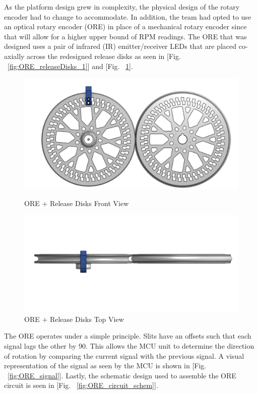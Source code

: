 As the platform design grew in complexity, the physical design of the rotary encoder had to change to accommodate. In addition, the team had opted to use an optical rotary encoder (ORE) in place of a mechanical rotary encoder since that will allow for a higher upper bound of RPM readings. The ORE that was designed uses a pair of infrared (IR) emitter/receiver LEDs that are placed co-axially across the redesigned release disks as seen in [Fig. ~\ref{fig:ORE_releaseDisks_1}] and [Fig. ~\ref{fig:ORE_releaseDisks_2}].

\begin{figure}[H]
\centering
\begin{minipage}{.5\textwidth}
  \centering
  \includegraphics[width=0.9\linewidth]{Controls/ORE_releaseDisks_1.PNG}
  \caption{\label{fig:ORE_releaseDisks_1}ORE + Release Disks Front View} 
\end{minipage}%
\begin{minipage}{.5\textwidth}
  \centering
  \includegraphics[width=1.0\linewidth]{Controls/ORE_releaseDisks_2.PNG}
  \caption{\label{fig:ORE_releaseDisks_2}ORE + Release Disks Top View}
\end{minipage}
\end{figure}

The ORE operates under a simple principle. Slits have an offsets such that each signal lags the other by 90\degree. This allows the MCU unit to determine the direction of rotation by comparing the current signal with the previous signal. A visual representation of the signal as seen by the MCU is shown in [Fig. ~\ref{fig:ORE_signal}]. Lastly, the schematic design used to assemble the ORE circuit is seen in [Fig. ~\ref{fig:ORE_circuit_schem}].

